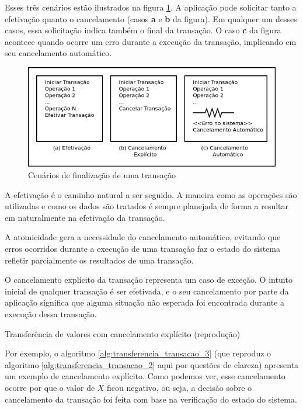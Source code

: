 \documentclass[11pt,twoside,a4paper]{book}
\begin{document}
Esses três cenários estão ilustrados na figura \ref{fig:cenarios_finalizacao}. A aplicação pode solicitar tanto a efetivação quanto o cancelamento (casos \textbf{a} e \textbf{b} da figura). Em qualquer um desses casos, essa solicitação indica também o final da transação. O caso \textbf{c} da figura acontece quando ocorre um erro durante a execução da transação, implicando em seu cancelamento automático.

\begin{figure}
  \centering
  \includegraphics[width=\textwidth]{cenarios_finalizacao} 
  \caption{Cenários de finalização de uma transação}
  \label{fig:cenarios_finalizacao} 
\end{figure}

A efetivação é o caminho natural a ser seguido. A maneira como as operações são utilizadas e como os dados são tratados é sempre planejada de forma a resultar em naturalmente na efetivação da transação.

A atomicidade gera a necessidade do cancelamento automático, evitando que erros ocorridos durante a execução de uma transação faz o estado do sistema refletir parcialmente os resultados de uma transação.

O cancelamento explícito da transação representa um caso de exceção. O intuito inicial de qualquer transação é ser efetivada, e o seu cancelamento por parte da aplicação significa que alguma situação não esperada foi encontrada durante a execução dessa transação.

\begin{algorithm}
\caption{Transferência de valores com cancelamento explícito (reprodução)}
\label{alg:transferencia_transacao_3}
\end{algorithm}

Por exemplo, o algoritmo \ref{alg:transferencia_transacao_3} (que reproduz o algoritmo \ref{alg:transferencia_transacao_2} aqui por questões de clareza) apresenta um exemplo de cancelamento explícito. Como podemos ver, esse cancelamento ocorre por que o valor de $X$ ficou negativo, ou seja, a decisão sobre o cancelamento da transação foi feita com base na verificação do estado do sistema.
\end{document}
